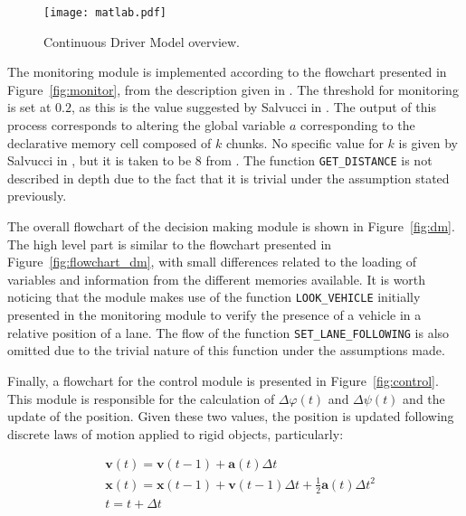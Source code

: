 \vspace{1em}
\begin{figure}[h]
    \centering
    \texttt{[image: matlab.pdf]}
    \caption{Continuous Driver Model overview.}
    \label{fig:driver_model_overview}
\end{figure}

The monitoring module is implemented according to the flowchart presented in Figure~\ref{fig:monitor}, from the description given in \cite{salvucci_1}. The threshold for monitoring is set at $0.2$, as this is the value suggested by Salvucci in \cite{salvucci_1}. The output of this process corresponds to altering the global variable $a$ corresponding to the declarative memory cell composed of $k$ chunks. No specific value for $k$ is given by Salvucci in \cite{salvucci_1}, but it is taken to be 8 from \cite{lam}. The function \texttt{GET\_DISTANCE} is not described in depth due to the fact that it is trivial under the assumption stated previously.

The overall flowchart of the decision making module is shown in Figure~\ref{fig:dm}. The high level part is similar to the flowchart presented in Figure~\ref{fig:flowchart_dm}, with small differences related to the loading of variables and information from the different memories available. It is worth noticing that the module makes use of the function \texttt{LOOK\_VEHICLE} initially presented in the monitoring module to verify the presence of a vehicle in a relative position of a lane. The flow of the function \texttt{SET\_LANE\_FOLLOWING} is also omitted due to the trivial nature of this function under the assumptions made.

Finally, a flowchart for the control module is presented in Figure~\ref{fig:control}. This module is responsible for the calculation of $\Delta\varphi(t)$ and $\Delta\psi(t)$ and the update of the position. Given these two values, the position is updated following discrete laws of motion applied to rigid objects, particularly:

\begin{equation}
\begin{aligned}
	& \mathbf{v}(t) = \mathbf{v}(t-1) + \mathbf{a}(t)\Delta t\\
	& \mathbf{x}(t) = \mathbf{x}(t-1) + \mathbf{v}(t-1)\Delta t + \frac{1}{2}  \mathbf{a}(t)\Delta t^2 \\
	& t = t + \Delta t
\end{aligned}
\end{equation}

